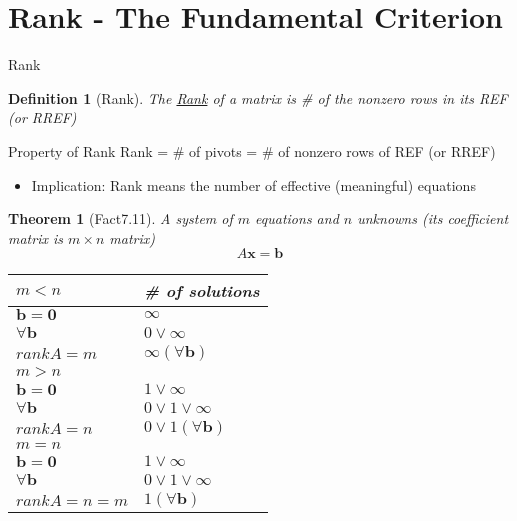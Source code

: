 \documentclass[final]{beamer}
\newtheorem{defn}{Definition}
\newtheorem{thm}{Theorem}
\begin{document}
\section{Rank - The Fundamental Criterion} %
\label{sec:rank_the_fundamental_criterion}
\begin{frame}[t]{Rank}
	\begin{defn}
		[Rank] The \uline{Rank} of a matrix is \# of the nonzero rows in its REF (or RREF)
	\end{defn}
	\begin{block}
		{Property of Rank}
		Rank = \# of pivots = \# of nonzero rows of REF (or RREF)
	\end{block}
	\begin{itemize}
		\item Implication: Rank means the number of effective (meaningful) equations
	\end{itemize}
\end{frame}
\begin{thm}
	[Fact7.11] A system of $m$ equations and $n$ unknowns (its coefficient matrix is $m\times n$ matrix)\[
		A\mathbf{x} = \mathbf{b}
	\]		
	\begin{center}
		\begin{scriptsize}
			\begin{tabular}{l|l}
				 $m<n$& \# of solutions\\
				 \hline
				 $\mathbf{b}=\mathbf{0}$& $\infty$\\
				 $\forall \mathbf{b}$& $0\lor \infty$\\
				 $rank A = m$ & $\infty (\forall \mathbf{b})$\\
				 \hline\hline
				 $m>n$&\\
				 \hline
				 $\mathbf{b}=\mathbf{0}$& $1\lor \infty$\\
				 $\forall \mathbf{b}$& $0\lor 1\lor \infty$\\
				 $rank A = n$ & $0\lor 1 (\forall \mathbf{b})$\\
				 \hline\hline
				 $m=n$&\\
				 \hline
				 $\mathbf{b}=\mathbf{0}$& $1\lor \infty$\\
				 $\forall \mathbf{b}$& $0\lor 1\lor \infty$\\
				 $rank A = n=m$ & $ 1 (\forall \mathbf{b})$\\
			\end{tabular}
		\end{scriptsize}
		
	\end{center}
\end{thm}
\end{document}
